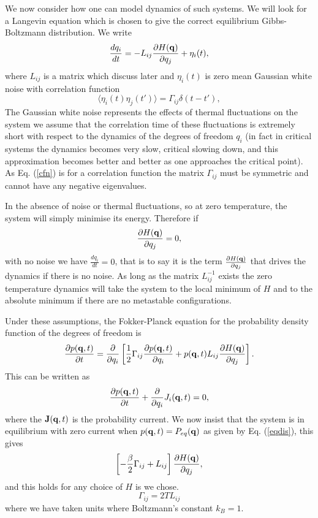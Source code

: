 \documentclass[11pt]{report}
\begin{document}
We now consider how one can model dynamics of such systems. We will look for a Langevin equation which is chosen to give the correct equilibrium Gibbs-Boltzmann distribution. We write
\begin{equation}
\frac{d q_i}{dt} = -L_{ij}\frac{\partial H({\bf q})}{ \partial q_j} + \eta_i(t),
\end{equation}
where $L_{ij}$ is a matrix which discuss later and $\eta_i(t)$ is zero mean Gaussian white noise  with correlation function 
\begin{equation}
\langle \eta_i(t)\eta_j(t')\rangle =  \Gamma_{ij} \delta(t-t'),\label{cfn}
\end{equation}
The Gaussian white noise represents the effects of thermal fluctuations on the system we assume that the correlation time of these fluctuations is extremely short with respect to the dynamics of the degrees of freedom $q_i$ (in fact in critical systems the dynamics becomes very slow, critical slowing down, and this approximation becomes better and better as one approaches the critical point).  As Eq. (\ref{cfn}) is for a correlation function the matrix $\Gamma_{ij}$ must be symmetric and cannot have any negative eigenvalues.

In the absence of noise or thermal fluctuations, so at zero temperature, the system will simply minimise its energy. Therefore if 
\begin{equation}
\frac{\partial H({\bf q})}{ \partial q_j} =0, 
\end{equation}
with no noise we have $\frac{d q_i}{dt}=0$, that is to say it is the term $\frac{\partial H({\bf q})}{ \partial q_j}$ that drives the dynamics if there is no noise. As long as the matrix $L_{ij}^{-1}$ exists the zero temperature dynamics will take the system to the local minimum of $H$ and to the absolute minimum if there are no metastable configurations. 

Under these assumptions, the Fokker-Planck equation for the probability density function of the degrees of freedom is 
\begin{equation}
\frac{\partial p({\bf q},t)}{\partial t} = \frac{\partial}{\partial q_i} \left[\frac{1}{2}\Gamma_{ij} \frac{\partial p({\bf q},t)}{\partial q_i} + p({\bf q},t) L_{ij}\frac{\partial H({\bf q})}{ \partial q_j}\right].
\end{equation}
This can be written as 
\begin{equation}
\frac{\partial p({\bf q},t)}{\partial t} +\frac{\partial}{\partial q_i}J_i({\bf q},t)=0,
\end{equation}
where the ${\bf J}({\bf q},t)$ is the probability current. We now insist that the system is in equilibrium with zero current when $p({\bf q},t)= P_{eq}({\bf q})$ as given by Eq. (\ref{eqdis}), this gives
\begin{equation}
\left[-\frac{\beta}{2}\Gamma_{ij} + L_{ij}\right]\frac{\partial H({\bf q})}{ \partial q_j},
\end{equation}
and this holds for any choice of $H$ is we chose.
\begin{equation}
\Gamma_{ij}= 2T L_{ij}
\end{equation}
where we have taken units where Boltzmann's constant $k_B=1$. 
\end{document}
